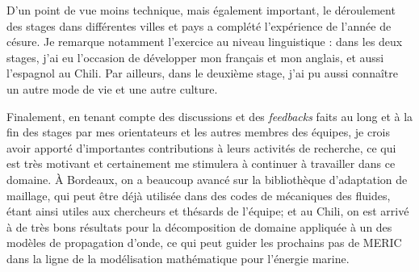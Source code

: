 \indent D'un point de vue moins technique, mais également important, le déroulement des stages dans différentes villes et pays a complété l'expérience de l'année de césure. Je remarque notamment l'exercice au niveau linguistique : dans les deux stages, j'ai eu l'occasion de développer mon français et mon anglais, et aussi l'espagnol au Chili. Par ailleurs, dans le deuxième stage, j'ai pu aussi connaître un autre mode de vie et une autre culture.

\indent Finalement, en tenant compte des discussions et des \emph{feedbacks} faits au long et à la fin des stages par mes orientateurs et les autres membres des équipes, je crois avoir apporté d'importantes contributions à leurs activités de recherche, ce qui est très motivant et certainement me stimulera à continuer à travailler dans ce domaine. À Bordeaux, on a beaucoup avancé sur la bibliothèque d'adaptation de maillage, qui peut être déjà utilisée dans des codes de mécaniques des fluides, étant ainsi utiles aux chercheurs et thésards de l'équipe; et au Chili, on est arrivé à de très bons résultats pour la décomposition de domaine appliquée à un des modèles de propagation  d'onde, ce qui peut guider les prochains pas de MERIC dans la ligne de la modélisation mathématique pour l'énergie marine.